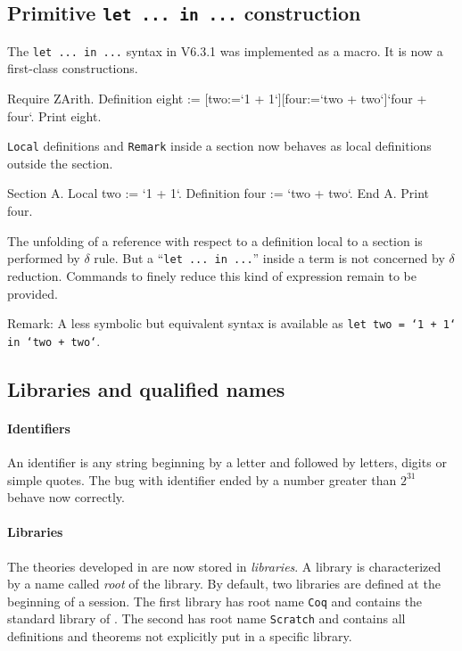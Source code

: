 \documentclass[11pt]{article}
\begin{document}
\subsection{Primitive {\tt let ... in ...} construction}
\label{Letin}
The {\tt let ... in ...} syntax in V6.3.1 was implemented as a
macro. It is now a first-class constructions.

\begin{coq_example}
Require ZArith.
Definition eight := [two:=`1 + 1`][four:=`two + two`]`four + four`. 
Print eight.
\end{coq_example}

{\tt Local} definitions and {\tt Remark} inside a section now behaves
as local definitions outside the section.

\begin{coq_example}
Section A.
Local two := `1 + 1`.
Definition four := `two + two`.
End A.
Print four.
\end{coq_example}

The unfolding of a reference with respect to a definition local to a section
is performed by $\delta$ rule. But a ``{\tt let ... in ...}'' inside a term
is not concerned by $\delta$ reduction. Commands to finely reduce this
kind of expression remain to be provided.
\medskip

Remark: A less symbolic but equivalent syntax is available as {\tt let
two = `1 + 1` in `two + two`}.

\subsection{Libraries and qualified names}
\label{Names}

\paragraph{Identifiers} An identifier is any string beginning by a
letter and followed by letters, digits or simple quotes. The bug with
identifier ended by a number greater than $2^{31}$ behave now correctly.

\paragraph{Libraries}

The theories developed in {\Coq} are now stored in {\it libraries}.  A
library is characterized by a name called {\it root} of the
library. By default, two libraries are defined at the beginning of a
{\Coq} session. The first library has root name {\tt Coq} and contains the
standard library of \Coq. The second has root name {\tt Scratch} and
contains all definitions and theorems not explicitly put in a specific
library. 
\end{document}
